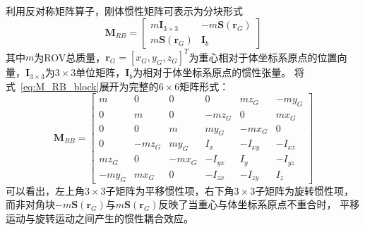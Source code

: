 利用反对称矩阵算子，刚体惯性矩阵可表示为分块形式
\begin{equation}
    \boldsymbol{M}_{RB}=
    \begin{bmatrix}
        m\boldsymbol{I}_{3\times3} & -m\boldsymbol{S}(\boldsymbol{r}_G) \\
        m\boldsymbol{S}(\boldsymbol{r}_G) & \boldsymbol{I}_b
    \end{bmatrix}
    \label{eq:M_RB_block}
\end{equation}
其中$m$为ROV总质量，$\boldsymbol{r}_G=[x_G,y_G,z_G]^T$为重心相对于体坐标系原点的位置向量，$\boldsymbol{I}_{3\times3}$为$3\times 3$单位矩阵，$\boldsymbol{I}_b$为相对于体坐标系原点的惯性张量。
将式~\eqref{eq:M_RB_block}展开为完整的$6\times6$矩阵形式：
\begin{equation}
    \boldsymbol{M}_{RB}=
    \begin{bmatrix}
        m & 0 & 0 & 0 & mz_G & -my_G \\
        0 & m & 0 & -mz_G & 0 & mx_G \\
        0 & 0 & m & my_G & -mx_G & 0 \\
        0 & -mz_G & my_G & I_x & -I_{xy} & -I_{xz} \\
        mz_G & 0 & -mx_G & -I_{yx} & I_y & -I_{yz} \\
        -my_G & mx_G & 0 & -I_{zx} & -I_{zy} & I_z
    \end{bmatrix}
    \label{eq:M_RB_full}
\end{equation}
可以看出，左上角$3\times3$子矩阵为平移惯性项，右下角$3\times3$子矩阵为旋转惯性项，而非对角块$-m\boldsymbol{S}(\boldsymbol{r}_G)$与$m\boldsymbol{S}(\boldsymbol{r}_G)$反映了当重心与体坐标系原点不重合时，
平移运动与旋转运动之间产生的惯性耦合效应。

